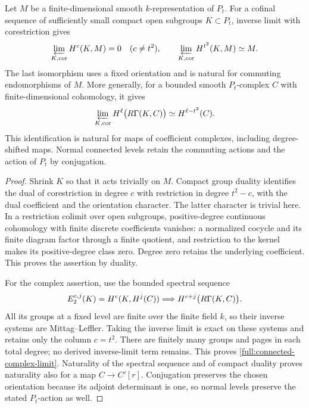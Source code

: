 \begin{lemma}
\label{full:corestriction}
Let $M$ be a finite-dimensional smooth $k$-representation of $P_t$.
For a cofinal sequence of sufficiently small compact open subgroups
$K\subset P_t$, inverse limit with corestriction gives
\[
 \varprojlim_{K,\mathrm{cor}} H^c(K,M)=0\quad(c\ne t^2),
 \qquad
 \varprojlim_{K,\mathrm{cor}} H^{t^2}(K,M)\simeq M.
\]
The last isomorphism uses a fixed orientation and is natural for
commuting endomorphisms of $M$.  More generally, for a bounded smooth
$P_t$-complex $C$ with finite-dimensional cohomology, it gives
\begin{equation}
\label{full:connected-complex-limit}
 \varprojlim_{K,\mathrm{cor}} H^\ell\bigl(R\Gamma(K,C)\bigr)
       \simeq H^{\ell-t^2}(C).
\end{equation}
This identification is natural for maps of coefficient complexes,
including degree-shifted maps.  Normal connected levels retain the
commuting actions and the action of $P_t$ by conjugation.
\end{lemma}

\begin{proof}
Shrink $K$ so that it acts trivially on $M$.  Compact group duality
identifies the dual of corestriction in degree $c$ with restriction in
degree $t^2-c$, with the dual coefficient and the orientation character.
The latter character is trivial here.  In a restriction colimit over
open subgroups, positive-degree continuous cohomology with finite
discrete coefficients vanishes: a normalized cocycle and its finite
diagram factor through a finite quotient, and restriction to the
kernel makes its positive-degree class zero.  Degree zero retains the
underlying coefficient.  This proves the assertion by duality.

For the complex assertion, use the bounded spectral sequence
\[
 E_2^{c,j}(K)=H^c(K,H^j(C))
       \Longrightarrow H^{c+j}\bigl(R\Gamma(K,C)\bigr).
\]
All its groups at a fixed level are finite over the finite field $k$,
so their inverse systems are Mittag--Leffler.  Taking the inverse limit
is exact on these systems and retains only the column $c=t^2$.
There are finitely many groups and pages in each total degree; no
derived inverse-limit term remains.  This proves
\eqref{full:connected-complex-limit}.  Naturality of the spectral
sequence and of compact duality proves naturality also for a map
$C\to C'[r]$.  Conjugation preserves the chosen orientation because
its adjoint determinant is one, so normal levels preserve the stated
$P_t$-action as well.
\end{proof}

